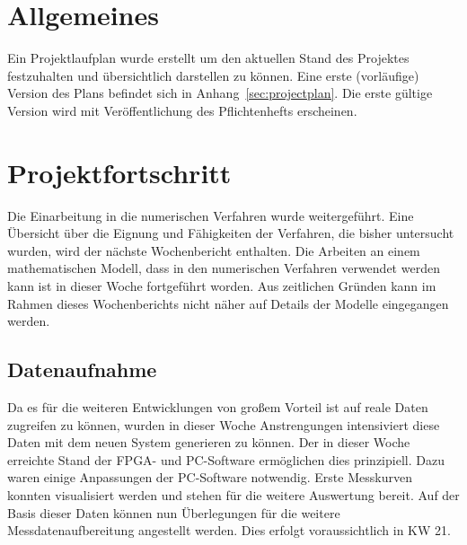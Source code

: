\documentclass[a4paper,12pt,fleqn]{article}
\begin{document}
\setlength{\headheight}{36pt}

\begin{titlepage}



\end{titlepage}

\section[Allgemeines]{Allgemeines}
Ein Projektlaufplan wurde erstellt um den aktuellen Stand des Projektes festzuhalten und übersichtlich darstellen zu können. Eine erste (vorläufige) Version des Plans befindet sich in Anhang~\ref{sec:projectplan}. Die erste gültige Version wird mit Veröffentlichung des Pflichtenhefts erscheinen.

\section[Fortschritt]{Projektfortschritt}
Die Einarbeitung in die numerischen Verfahren wurde weitergeführt. Eine Übersicht über die Eignung und Fähigkeiten der Verfahren, die bisher untersucht wurden, wird der nächste Wochenbericht enthalten. Die Arbeiten an einem mathematischen Modell, dass in den numerischen Verfahren verwendet werden kann ist in dieser Woche fortgeführt worden. Aus zeitlichen Gründen kann im Rahmen dieses Wochenberichts nicht näher auf Details der Modelle eingegangen werden.

\subsection{Datenaufnahme}
Da es für die weiteren Entwicklungen von großem Vorteil ist auf reale Daten zugreifen zu können, wurden in dieser Woche Anstrengungen intensiviert diese Daten mit dem neuen System generieren zu können. Der in dieser Woche erreichte Stand der FPGA- und PC-Software ermöglichen dies prinzipiell. Dazu waren einige Anpassungen der PC-Software notwendig. Erste Messkurven konnten visualisiert werden und stehen für die weitere Auswertung bereit. Auf der Basis dieser Daten können nun Überlegungen für die weitere Messdatenaufbereitung angestellt werden. Dies erfolgt voraussichtlich in KW 21.
\end{document}
